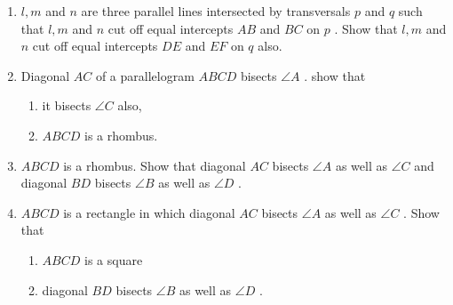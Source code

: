 \begin{enumerate}[label=\arabic*.,ref=\thesubsection.\theenumi]
\begin{enumerate}
\end{enumerate}
%
\item $l, m$ and $n$ are three parallel lines intersected by transversals $p$ and $q$ such that $l, m$ and $n$ cut off equal intercepts $AB$ and $BC$ on $p$ . Show that $l, m$ and $n$ cut off equal intercepts $DE$ and $EF$ on $q$ also.
%
\item Diagonal $AC$ of a parallelogram $ABCD$ bisects $\angle A$ . show that 
\begin{enumerate}
\item it bisects  $\angle C$  also, 
\item $ABCD$ is a rhombus.
\end{enumerate}
%
\item $ABCD$ is a rhombus. Show that diagonal $AC$ bisects $\angle A$ as well as  $\angle C$  and diagonal $BD$ bisects  $\angle B$  as well as  $\angle D$ .
\item $ABCD$ is a rectangle in which diagonal $AC$ bisects $\angle A$ as well as  $\angle C$ . Show that 
\begin{enumerate}
\item $ABCD$ is a square 
\item diagonal $BD$ bisects  $\angle B$  as well as  $\angle D$ .
%
\end{enumerate}


\end{enumerate}
